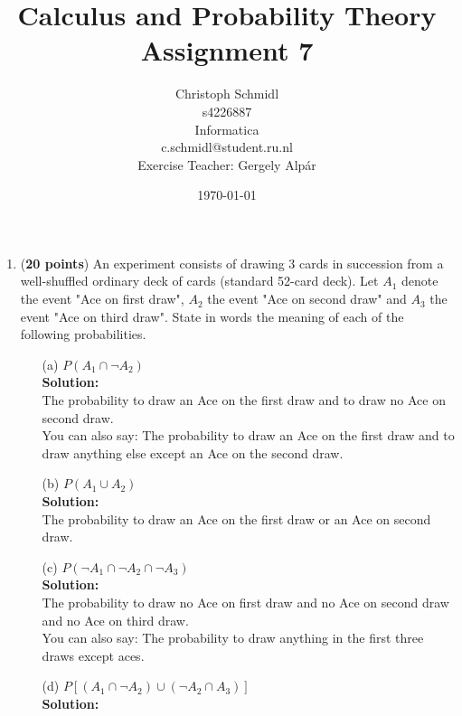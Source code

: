 \documentclass[a4paper]{article}
\title{Calculus and Probability Theory\\ Assignment 7}
\author{Christoph Schmidl\\
s4226887\\
Informatica\\
c.schmidl@student.ru.nl\\
Exercise Teacher: Gergely Alp\'{a}r}
\date{\today}
\begin{document}
\maketitle

\begin{enumerate}

\item (\textbf{20 points}) An experiment consists of drawing 3 cards in succession from a well-shuffled ordinary deck of cards (standard 52-card deck). Let $A_1$ denote the event "Ace on first draw", $A_2$ the event "Ace on second draw" and $A_3$ the event "Ace on third draw". State in words the meaning of each of the following probabilities.








\begin{enumerate}
	\item[(a)] $P(A_1 \cap \neg A_2)$\\
	\textbf{Solution:}\\
	
	
The probability to draw an Ace on the first draw and to draw no Ace on second draw.\\
You can also say: The probability to draw an Ace on the first draw and to draw anything else except an Ace on the second draw.\\		
	
	
	\item[(b)] $P(A_1 \cup A_2)$\\
	\textbf{Solution:}\\

The probability to draw an Ace on the first draw or an Ace on second draw.\\
	
	
	
	\item[(c)] $P(\neg A_1 \cap \neg A_2 \cap \neg A_3)$\\
	\textbf{Solution:}\\
	

The probability to draw no Ace on first draw and no Ace on second draw and no Ace on third draw.\\
You can also say: The probability to draw anything in the first three draws except aces.\\


	
	\item[(d)] $P[(A_1 \cap \neg A_2) \cup (\neg A_2 \cap A_3)]$\\
	\textbf{Solution:}\\
	

\end{enumerate}
\end{enumerate}
\end{document}

